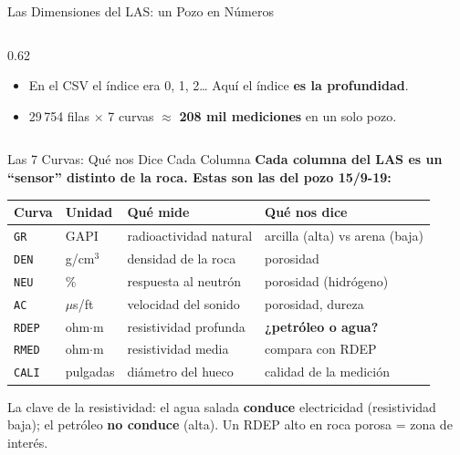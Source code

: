 \documentclass[aspectratio=169, 11pt]{beamer}
\begin{document}
\begin{frame}[shrink=8]{Las Dimensiones del LAS: un Pozo en Números}
\begin{columns}[T]
\begin{column}{0.62\textwidth}
      \vspace{8pt}
      {\scriptsize\color{textMuted}
      \begin{itemize}\setlength{\itemsep}{4pt}
        \item[{\color{arcaRed}\scriptsize\faArrowRight}]
          En el CSV el índice era 0, 1, 2\ldots
          Aquí el índice \textbf{es la profundidad}.
        \item[{\color{arcaRed}\scriptsize\faArrowRight}]
          29\,754 filas \(\times\) 7 curvas
          \(\approx\) \textbf{208 mil mediciones} en un solo pozo.
      \end{itemize}
      }
    \end{column}
  \end{columns}
\end{frame}

\begin{frame}[shrink=10]{Las 7 Curvas: Qué nos Dice Cada Columna}
  \vspace{-6pt}
  {\small\color{arcaDark}\bfseries
    Cada columna del LAS es un ``sensor'' distinto de la roca. Estas son las del pozo 15/9-19:}

  \vspace{5pt}
  \centering
  {\footnotesize
  \renewcommand{\arraystretch}{1.4}
  \begin{tabular}{@{}l l l l@{}}
    \toprule
    {\bfseries\color{arcaRed} Curva} & {\bfseries\color{arcaDark} Unidad}
      & {\bfseries\color{arcaDark} Qué mide} & {\bfseries\color{arcaDark} Qué nos dice} \\
    \midrule
    \texttt{GR}   & GAPI  & radioactividad natural & arcilla (alta) vs arena (baja) \\
    \texttt{DEN}  & g/cm\(^3\) & densidad de la roca & porosidad \\
    \texttt{NEU}  & \%    & respuesta al neutrón & porosidad (hidrógeno) \\
    \texttt{AC}   & \(\mu\)s/ft & velocidad del sonido & porosidad, dureza \\
    \texttt{RDEP} & ohm\(\cdot\)m & resistividad profunda & \textbf{¿petróleo o agua?} \\
    \texttt{RMED} & ohm\(\cdot\)m & resistividad media & compara con RDEP \\
    \texttt{CALI} & pulgadas & diámetro del hueco & calidad de la medición \\
    \bottomrule
  \end{tabular}
  }

  \vspace{8pt}
  {\scriptsize\color{textMuted}
    \faLightbulb[regular]\hspace{3pt}%
    La clave de la resistividad: el agua salada \textbf{conduce} electricidad (resistividad baja);
    el petróleo \textbf{no conduce} (alta). Un RDEP alto en roca porosa = zona de interés.}
\end{frame}
\end{document}
